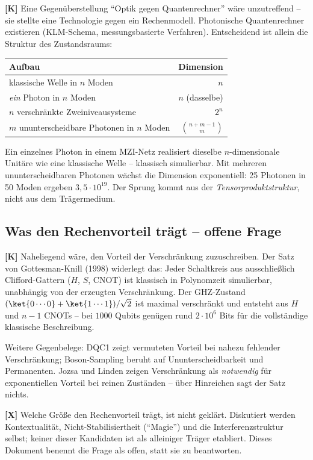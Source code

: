 \textbf{[K]} Eine Gegenüberstellung ``Optik gegen Quantenrechner''
wäre unzutreffend -- sie stellte eine Technologie gegen ein Rechenmodell.
Photonische Quantenrechner existieren (KLM-Schema, messungsbasierte
Verfahren). Entscheidend ist allein die Struktur des Zustandsraums:

\begin{center}
\begin{tabular}{lr}
\toprule
Aufbau & Dimension \\
\midrule
klassische Welle in $n$ Moden & $n$ \\
\emph{ein} Photon in $n$ Moden & $n$ \quad(dasselbe) \\
$n$ verschränkte Zweiniveausysteme & $2^n$ \\
$m$ ununterscheidbare Photonen in $n$ Moden & $\binom{n+m-1}{m}$ \\
\bottomrule
\end{tabular}
\end{center}

Ein einzelnes Photon in einem MZI-Netz realisiert dieselbe
$n$-dimensionale Unitäre wie eine klassische Welle -- klassisch
simulierbar. Mit mehreren ununterscheidbaren Photonen wächst die Dimension
exponentiell: 25 Photonen in 50 Moden ergeben $3{,}5\cdot10^{19}$. Der
Sprung kommt aus der \emph{Tensorproduktstruktur}, nicht aus dem
Trägermedium.

\subsection{Was den Rechenvorteil trägt -- offene Frage}

\textbf{[K]} Naheliegend wäre, den Vorteil der Verschränkung zuzuschreiben.
Der Satz von Gottesman-Knill (1998) widerlegt das: Jeder Schaltkreis aus
ausschließlich Clifford-Gattern ($H$, $S$, CNOT) ist klassisch in
Polynomzeit simulierbar, unabhängig von der erzeugten Verschränkung. Der
GHZ-Zustand $(\ket{0\cdots0} + \ket{1\cdots1})/\sqrt2$ ist maximal
verschränkt und entsteht aus $H$ und $n-1$ CNOTs -- bei $1000$ Qubits
genügen rund $2\cdot10^{6}$ Bits für die vollständige klassische
Beschreibung.

Weitere Gegenbelege: DQC1 zeigt vermuteten Vorteil bei nahezu fehlender
Verschränkung; Boson-Sampling beruht auf Ununterscheidbarkeit und
Permanenten. Jozsa und Linden \cite{Jozsa2003} zeigen Verschränkung als
\emph{notwendig} für exponentiellen Vorteil bei reinen Zuständen -- über
Hinreichen sagt der Satz nichts.

\textbf{[X]} Welche Größe den Rechenvorteil trägt, ist nicht geklärt.
Diskutiert werden Kontextualität, Nicht-Stabilisiertheit
(``Magie'') und die Interferenzstruktur selbst; keiner dieser
Kandidaten ist als alleiniger Träger etabliert. Dieses Dokument benennt
die Frage als offen, statt sie zu beantworten.

